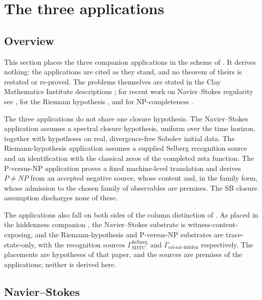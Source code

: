 \section{The three applications}\label{sec:validation}

\subsection{Overview}\label{sec:validation:intro}

This section places the three companion applications in the scheme of
.  It derives nothing: the applications are cited
as they stand, and no theorem of theirs is restated or re-proved.  The
problems themselves are stated in the Clay Mathematics Institute
descriptions \cite{Fefferman2000NavierStokes,Bombieri2000Riemann,Cook2000PvsNP};
for recent work on Navier--Stokes regularity see
\cite{Tao2016NSAveragedBlowup,BuckmasterVicol2019NS}, for the Riemann
hypothesis \cite{Conrey2003RH,IwaniecKowalski2004ANT}, and for
NP-completeness \cite{Cook1971NPCompleteness,Karp1972NPComplete21}.

The three applications do not share one closure hypothesis.  The
Navier--Stokes application \cite{Tsiokos2026NavierStokes} assumes a
spectral closure hypothesis, uniform over the time horizon, together with hypotheses on
real, divergence-free Sobolev initial data.  The Riemann-hypothesis
application \cite{Tsiokos2026RH} assumes a supplied Selberg recognition
source and an identification with the classical zeros of the completed
zeta function.  The P-versus-NP application \cite{Tsiokos2026PvNP}
proves a fixed machine-level translation and derives \(P\neq NP\) from
an accepted negative source, whose content and, in the family form,
whose admission to the chosen family of observables are premises.  The
SB closure assumption discharges none of these.

The applications also fall on both sides of the column distinction of
.  As placed in the
hiddenness companion \cite{Tsiokos2026CSL}, the Navier--Stokes
substrate is witness-content-exposing, and the Riemann-hypothesis and
P-versus-NP substrates are trace-state-only, with the recognition
sources \(\Gamma_{\mathrm{SDTC}}^{\mathrm{Selberg}}\) and
\(\Gamma_{\mathrm{csl\text{-}sat\text{-}hidden}}\) respectively.  The
placements are hypotheses of that paper, and the sources are premises
of the applications; neither is derived here.

\subsection{Navier--Stokes}\label{sec:validation:ns}

